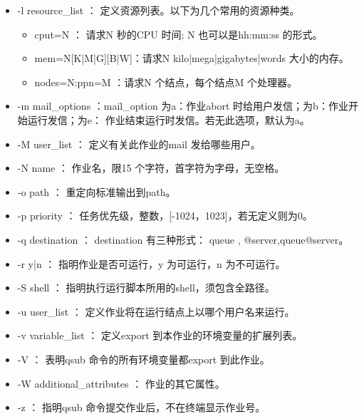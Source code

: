{\begin{itemize}
\item -l resource\_list ： 定义资源列表。以下为几个常用的资源种类。
	\begin{itemize}
	\item  cput=N ： 请求N 秒的CPU 时间; N 也可以是hh:mm:ss 的形式。	
	
	\item mem=N[K|M|G][B|W]：请求N {kilo|mega|giga}{bytes|words} 大小的内存。
	
	\item nodes=N:ppn=M ：请求N 个结点，每个结点M 个处理器。
	\end{itemize}

\item -m mail\_options ：mail\_option 为a：作业abort 时给用户发信；为b：作业开始运行发信；为e：
作业结束运行时发信。若无此选项，默认为a。

\item -M user\_list ： 定义有关此作业的mail 发给哪些用户。

\item -N name ： 作业名，限15 个字符，首字符为字母，无空格。

\item -o path ： 重定向标准输出到path。

\item -p priority ： 任务优先级，整数，[-1024，1023]，若无定义则为0。

\item -q destination ： destination 有三种形式： queue , @server,queue@server。

\item -r y|n ： 指明作业是否可运行，y 为可运行，n 为不可运行。

\item -S shell ： 指明执行运行脚本所用的shell，须包含全路径。

\item -u user\_list ： 定义作业将在运行结点上以哪个用户名来运行。

\item -v variable\_list ： 定义export 到本作业的环境变量的扩展列表。

\item -V ： 表明qsub 命令的所有环境变量都export 到此作业。

\item -W additional\_attributes ： 作业的其它属性。

\item -z ： 指明qsub 命令提交作业后，不在终端显示作业号。
\end{itemize}


}
